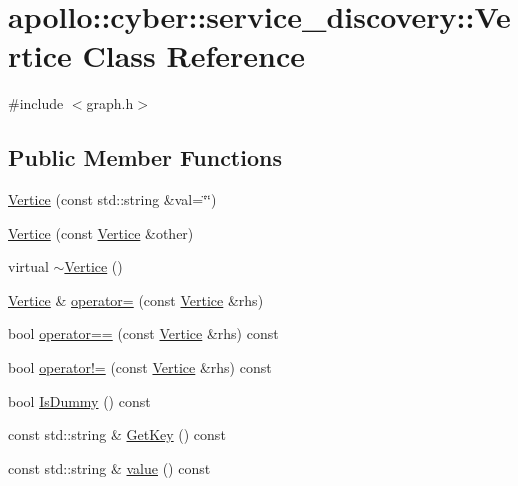 \hypertarget{classapollo_1_1cyber_1_1service__discovery_1_1Vertice}{\section{apollo\-:\-:cyber\-:\-:service\-\_\-discovery\-:\-:Vertice Class Reference}
\label{classapollo_1_1cyber_1_1service__discovery_1_1Vertice}
}


{\ttfamily \#include $<$graph.\-h$>$}

\subsection*{Public Member Functions}
\begin{DoxyCompactItemize}
\item 
\hyperlink{classapollo_1_1cyber_1_1service__discovery_1_1Vertice_acef383fe1d61e896fcacd0f8c9284751}{Vertice} (const std\-::string \&val=\char`\"{}\char`\"{})
\item 
\hyperlink{classapollo_1_1cyber_1_1service__discovery_1_1Vertice_a5a097253b9ea8b3664f386c8c9726376}{Vertice} (const \hyperlink{classapollo_1_1cyber_1_1service__discovery_1_1Vertice}{Vertice} \&other)
\item 
virtual \hyperlink{classapollo_1_1cyber_1_1service__discovery_1_1Vertice_a2b155503d4d376e98610a86c14182dc7}{$\sim$\-Vertice} ()
\item 
\hyperlink{classapollo_1_1cyber_1_1service__discovery_1_1Vertice}{Vertice} \& \hyperlink{classapollo_1_1cyber_1_1service__discovery_1_1Vertice_ac25eb57384d07c4d59d7c7e91af1f04b}{operator=} (const \hyperlink{classapollo_1_1cyber_1_1service__discovery_1_1Vertice}{Vertice} \&rhs)
\item 
bool \hyperlink{classapollo_1_1cyber_1_1service__discovery_1_1Vertice_afc113a0ecde611a02bda4a01858aa171}{operator==} (const \hyperlink{classapollo_1_1cyber_1_1service__discovery_1_1Vertice}{Vertice} \&rhs) const 
\item 
bool \hyperlink{classapollo_1_1cyber_1_1service__discovery_1_1Vertice_a0252dcb0f18a3ad626fc40a5252a14a0}{operator!=} (const \hyperlink{classapollo_1_1cyber_1_1service__discovery_1_1Vertice}{Vertice} \&rhs) const 
\item 
bool \hyperlink{classapollo_1_1cyber_1_1service__discovery_1_1Vertice_a757183fe207b2a77f2a5e2e97960b8fe}{Is\-Dummy} () const 
\item 
const std\-::string \& \hyperlink{classapollo_1_1cyber_1_1service__discovery_1_1Vertice_a4dcf6d4175e4cb7d170e593f699d1477}{Get\-Key} () const 
\item 
const std\-::string \& \hyperlink{classapollo_1_1cyber_1_1service__discovery_1_1Vertice_af403a027dc59b1e3426c21dc5dd7be1f}{value} () const 
\end{DoxyCompactItemize}
